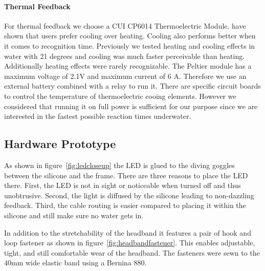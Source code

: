 \paragraph{Thermal Feedback}

For thermal feedback we choose a CUI CP6014 Thermoelectric Module. 
\cite{Peiris_thermoVR} have shown that users prefer cooling over heating.
Cooling also performs better when it comes to recognition time.
Previously we tested heating and cooling effects in water with 21 degrees and cooling was much faster perceivable than heating.
Additionally heating effects were rarely recognizable.
The Peltier module has a maximum voltage of 2.1V and maximum current of 6 A.
Therefore we use an external battery combined with a relay to run it.
There are specific circuit boards to control the temperature of thermoelectric cooing elements.
However we considered that running it on full power is sufficient for our purpose since we are interested in the fastest possible reaction times underwater.


\subsection{Hardware Prototype}

As shown in figure~\ref{fig:ledcloseup} the LED is glued to the diving goggles between the silicone and the frame.
There are three reasons to place the LED there.
First, the LED is not in sight or noticeable when turned off and thus unobtrusive.
Second, the light is diffused by the silicone leading to non-dazzling feedback.
Third, the cable routing is easier compared to placing it within the silicone and still make sure no water gets in.
%

In addition to the stretchability of the headband it features  a pair of hook and loop fastener as shown in figure~\ref{fig:headbandfastener}.
This enables adjustable, tight, and still comfortable wear of the headband.
The fasteners were sewn to the 40mm wide elastic band using a Bernina 880.


